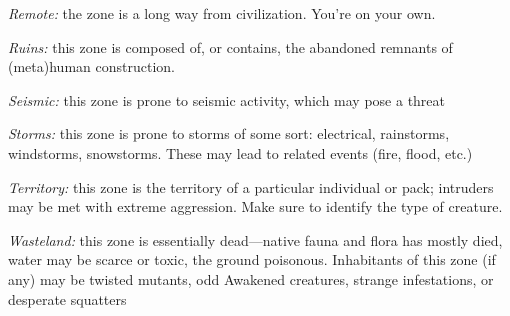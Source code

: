 \documentclass[oneside,10pt]{article}
\begin{document}
\begin{multicols}{2}
\begin{dent}
\textit{Remote:} the zone is a long way from civilization. You’re
on your own.

\textit{Ruins:} this zone is composed of, or contains, the abandoned remnants of (meta)human construction.

\textit{Seismic:} this zone is prone to seismic activity, which may
pose a threat

\textit{Storms:} this zone is prone to storms of some sort: electrical, rainstorms, windstorms, snowstorms. These may lead
to related events (fire, flood, etc.)

\textit{Territory:} this zone is the territory of a particular individual
or pack; intruders may be met with extreme aggression.
Make sure to identify the type of creature.

\textit{Wasteland:} this zone is essentially dead—native fauna and
flora has mostly died, water may be scarce or toxic, the
ground poisonous. Inhabitants of this zone (if any) may be
twisted mutants, odd Awakened creatures, strange infestations, or desperate squatters
\end{dent}

\end{multicols}

\end{document}
